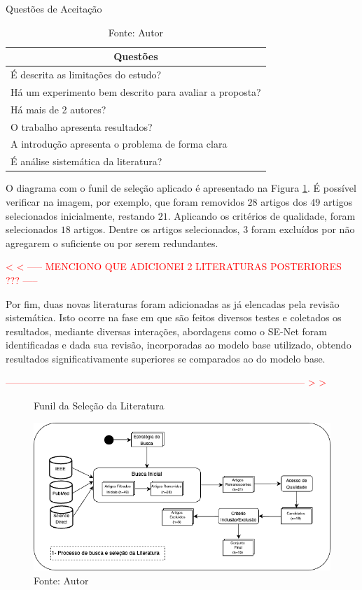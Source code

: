 \begin{table}[hbtp]
    \centering
    \caption{Questões de Aceitação}
    \renewcommand{\arraystretch}{1.4} %
    \begin{tabular}{|l|}
    \hline 
          \multicolumn{1}{|c|}{\textbf{Questões}} \\ 
    \hline 
        \quad É descrita as limitações do estudo? \\
        \quad Há um experimento bem descrito para avaliar a proposta? \\
        \quad Há mais de 2 autores? \\
        \quad O trabalho apresenta resultados? \\
        \quad A introdução apresenta o problema de forma clara \\
        \quad É análise sistemática da literatura? \\
    \hline 
    \end{tabular} 
    \caption*{Fonte: Autor}
    \label{tab:questoes}
\end{table}

O diagrama com o funil de seleção aplicado é apresentado na Figura \ref{fig:fig021}. É possível verificar na imagem, por exemplo, que foram removidos $28$ artigos dos $49$ artigos selecionados inicialmente, restando $21$. Aplicando os critérios de qualidade, foram selecionados $18$ artigos. Dentre os artigos selecionados, $3$ foram excluídos por não agregarem o suficiente ou por serem redundantes.

\textcolor{red}{
< < ----- MENCIONO QUE ADICIONEI 2 LITERATURAS POSTERIORES ??? -----
}

Por fim, duas novas literaturas foram adicionadas as já elencadas pela revisão sistemática. Isto ocorre na fase em que são feitos diversos testes e coletados os resultados, mediante diversas interações, abordagens como o \gls{SE}-Net foram identificadas e dada sua revisão, incorporadas ao modelo base utilizado, obtendo resultados significativamente superiores se comparados ao do modelo base.


\textcolor{red}{
-------------------------------------------------------------------------------------------- > >
}

\begin{figure}[h!]
    \centering
    \caption{Funil da Seleção da Literatura}
    \includegraphics[width=1\textwidth]{figures/fig021.png}
    \caption*{Fonte: Autor}
    \label{fig:fig021}
\end{figure}

